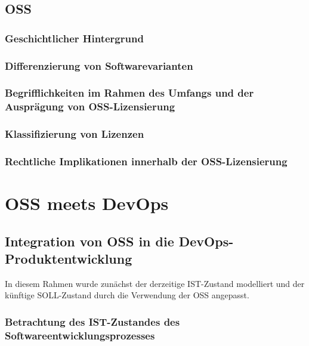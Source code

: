 \documentclass[12pt,titlepage]{report}
\begin{document}
\section{OSS}


\subsection{Geschichtlicher Hintergrund}


\subsection{Differenzierung von Softwarevarianten}


\subsection{Begrifflichkeiten im Rahmen des Umfangs und der Ausprägung von OSS-Lizensierung}


\subsection{Klassifizierung von Lizenzen}


\subsection{Rechtliche Implikationen innerhalb der OSS-Lizensierung}


\chapter{OSS meets DevOps}


\section{Integration von OSS in die DevOps-Produktentwicklung}
In diesem Rahmen wurde zunächst der derzeitige IST-Zustand modelliert und der künftige SOLL-Zustand durch die Verwendung der OSS angepasst.

\subsection{Betrachtung des IST-Zustandes des Softwareentwicklungsprozesses}

\end{document}
